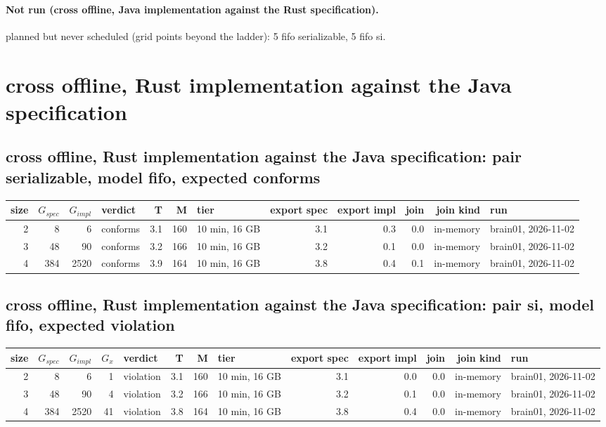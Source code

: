 \documentclass[10pt]{article}
\begin{document}
\paragraph{Not run (cross offline, Java implementation against the Rust specification).}
planned but never scheduled (grid points beyond the ladder): 5 fifo serializable, 5 fifo si.\par
\section*{cross offline, Rust implementation against the Java specification}
\subsection*{cross offline, Rust implementation against the Java specification: pair \textsf{serializable}, model fifo, expected conforms}
\begin{longtable}{@{}rrrlrrlrrrrl@{}}
\toprule
size & $G_{\mathit{spec}}$ & $G_{\mathit{impl}}$ & verdict & T & M & tier & export spec & export impl & join & join kind & run \\
\midrule
\endhead
\color{red} 2 & 8 & 6 & conforms & 3.1 & 160 & 10 min, 16 GB & 3.1 & 0.3 & 0.0 & in-memory & brain01, 2026-11-02 \\
\color{red} 3 & 48 & 90 & conforms & 3.2 & 166 & 10 min, 16 GB & 3.2 & 0.1 & 0.0 & in-memory & brain01, 2026-11-02 \\
\color{red} 4 & 384 & 2520 & conforms & 3.9 & 164 & 10 min, 16 GB & 3.8 & 0.4 & 0.1 & in-memory & brain01, 2026-11-02 \\
\bottomrule
\end{longtable}
\subsection*{cross offline, Rust implementation against the Java specification: pair \textsf{si}, model fifo, expected violation}
\begin{longtable}{@{}rrrrlrrlrrrrl@{}}
\toprule
size & $G_{\mathit{spec}}$ & $G_{\mathit{impl}}$ & $G_x$ & verdict & T & M & tier & export spec & export impl & join & join kind & run \\
\midrule
\endhead
\color{red} 2 & 8 & 6 & 1 & violation & 3.1 & 160 & 10 min, 16 GB & 3.1 & 0.0 & 0.0 & in-memory & brain01, 2026-11-02 \\
\color{red} 3 & 48 & 90 & 4 & violation & 3.2 & 166 & 10 min, 16 GB & 3.2 & 0.1 & 0.0 & in-memory & brain01, 2026-11-02 \\
\color{red} 4 & 384 & 2520 & 41 & violation & 3.8 & 164 & 10 min, 16 GB & 3.8 & 0.4 & 0.0 & in-memory & brain01, 2026-11-02 \\
\bottomrule
\end{longtable}
\end{document}
